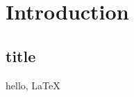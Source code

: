\documentclass[12pt]{report}
\begin{document}
\chapter{Introduction}

\section*{title}

hello, \LaTeX
\end{document}
